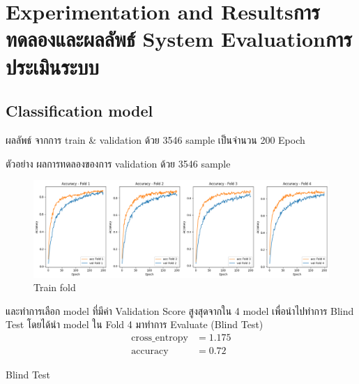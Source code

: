\chapter{\ifproject%
\ifenglish Experimentation and Results\else การทดลองและผลลัพธ์\fi
\else%
\ifenglish System Evaluation\else การประเมินระบบ\fi
\fi}


\section{Classification model}
\par ผลลัพธ์ จากการ train \& validation ด้วย 3546 sample เป็นจำนวน 200 Epoch

ตัวอย่าง ผลการทดลองของการ validation ด้วย 3546 sample
\begin{figure}[h]
  \begin{center}
  
  \includegraphics[scale=0.4]{pic/model/train_fold.png}
  \end{center}
  
  \caption[Train fold]{Train fold}
  \label{fig:Train fold}
  \end{figure}


  และทำการเลือก model ที่มีค่า Validation Score สูงสุดจากใน 4 model  
  เพื่อนำไปทำการ Blind Test 
  โดยได้นำ model ใน  Fold 4   มาทำการ
  Evaluate (Blind Test)
  \begin{align}
    \text{cross\_entropy} &= 1.175 \\
    \text{accuracy} &= 0.72
  \end{align}
 
Blind Test

